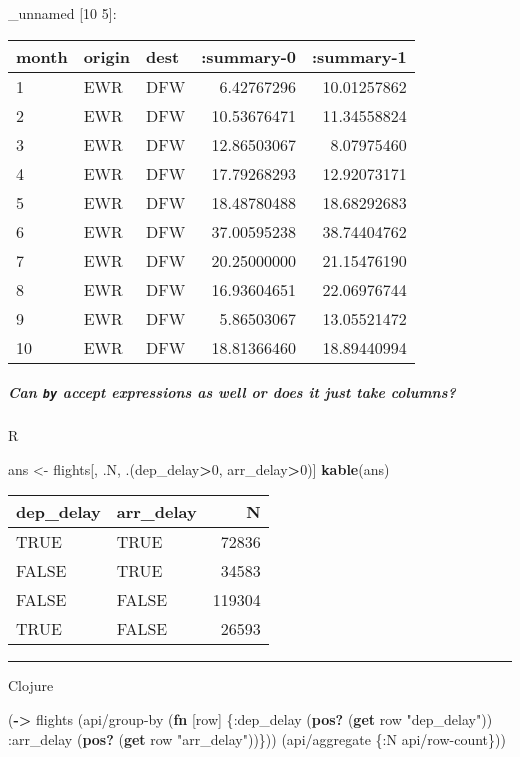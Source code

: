 \documentclass[]{article}
\newenvironment{Shaded}{\begin{snugshade}}{\end{snugshade}}
\newcommand{\KeywordTok}[1]{\textcolor[rgb]{0.13,0.29,0.53}{\textbf{#1}}}
\newcommand{\DecValTok}[1]{\textcolor[rgb]{0.00,0.00,0.81}{#1}}
\newcommand{\StringTok}[1]{\textcolor[rgb]{0.31,0.60,0.02}{#1}}
\newcommand{\OperatorTok}[1]{\textcolor[rgb]{0.81,0.36,0.00}{\textbf{#1}}}
\newcommand{\AttributeTok}[1]{\textcolor[rgb]{0.77,0.63,0.00}{#1}}
\newcommand{\NormalTok}[1]{#1}
\let\oldsubparagraph\subparagraph
\renewcommand{\subparagraph}[1]{\oldsubparagraph{#1}\mbox{}}
\begin{document}
\_unnamed {[}10 5{]}:

\begin{longtable}[]{@{}lllrr@{}}
\toprule
month & origin & dest & :summary-0 & :summary-1\tabularnewline
\midrule
\endhead
1 & EWR & DFW & 6.42767296 & 10.01257862\tabularnewline
2 & EWR & DFW & 10.53676471 & 11.34558824\tabularnewline
3 & EWR & DFW & 12.86503067 & 8.07975460\tabularnewline
4 & EWR & DFW & 17.79268293 & 12.92073171\tabularnewline
5 & EWR & DFW & 18.48780488 & 18.68292683\tabularnewline
6 & EWR & DFW & 37.00595238 & 38.74404762\tabularnewline
7 & EWR & DFW & 20.25000000 & 21.15476190\tabularnewline
8 & EWR & DFW & 16.93604651 & 22.06976744\tabularnewline
9 & EWR & DFW & 5.86503067 & 13.05521472\tabularnewline
10 & EWR & DFW & 18.81366460 & 18.89440994\tabularnewline
\bottomrule
\end{longtable}

\subparagraph{\texorpdfstring{Can \texttt{by} accept expressions as well
or does it just take
columns?}{Can by accept expressions as well or does it just take columns?}}\label{can-by-accept-expressions-as-well-or-does-it-just-take-columns}

R

\begin{Shaded}
\begin{Highlighting}[]
\NormalTok{ans <-}\StringTok{ }\NormalTok{flights[, .N, .(dep_delay}\OperatorTok{>}\DecValTok{0}\NormalTok{, arr_delay}\OperatorTok{>}\DecValTok{0}\NormalTok{)]}
\KeywordTok{kable}\NormalTok{(ans)}
\end{Highlighting}
\end{Shaded}

\begin{longtable}[]{@{}llr@{}}
\toprule
dep\_delay & arr\_delay & N\tabularnewline
\midrule
\endhead
TRUE & TRUE & 72836\tabularnewline
FALSE & TRUE & 34583\tabularnewline
FALSE & FALSE & 119304\tabularnewline
TRUE & FALSE & 26593\tabularnewline
\bottomrule
\end{longtable}

\begin{center}\rule{0.5\linewidth}{0.5pt}\end{center}

Clojure

\begin{Shaded}
\begin{Highlighting}[]
\NormalTok{(}\KeywordTok{->}\NormalTok{ flights}
\NormalTok{    (api/group-by (}\KeywordTok{fn}\NormalTok{ [row]}
\NormalTok{                    \{}\AttributeTok{:dep}\NormalTok{_delay (}\KeywordTok{pos?}\NormalTok{ (}\KeywordTok{get}\NormalTok{ row }\StringTok{"dep_delay"}\NormalTok{))}
                     \AttributeTok{:arr}\NormalTok{_delay (}\KeywordTok{pos?}\NormalTok{ (}\KeywordTok{get}\NormalTok{ row }\StringTok{"arr_delay"}\NormalTok{))\}))}
\NormalTok{    (api/aggregate \{}\AttributeTok{:N}\NormalTok{ api/row-count\}))}
\end{Highlighting}
\end{Shaded}
\end{document}
